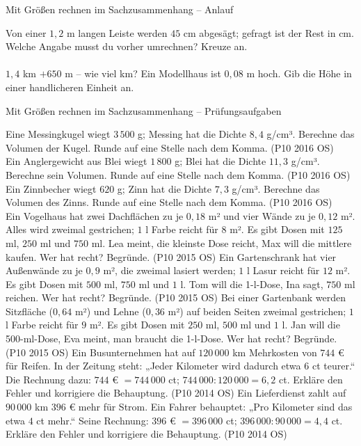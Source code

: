 \begin{aufgabe}{Mit Größen rechnen im Sachzusammenhang – Anlauf}
\begin{teile}
\teil Von einer $1{,}2$ m langen Leiste werden $45$ cm abgesägt; gefragt ist der Rest in cm. Welche Angabe musst du vorher umrechnen? Kreuze an.\\ \\ 
\teil $1{,}4$ km $+ 650$ m – wie viel km? \leerfeld[km]
\teil Ein Modellhaus ist $0{,}08$ m hoch. Gib die Höhe in einer handlicheren Einheit an. \leerfeld \leerfeld
\end{teile}
\end{aufgabe}

\begin{aufgabe}{Mit Größen rechnen im Sachzusammenhang – Prüfungsaufgaben}
\begin{teile}
\teil Eine Messingkugel wiegt $3\,500$ g; Messing hat die Dichte $8{,}4$ g/cm³. Berechne das Volumen der Kugel. Runde auf eine Stelle nach dem Komma. \hfill (P10 2016 OS) \\ \leerfeld[cm³]
\teil Ein Anglergewicht aus Blei wiegt $1\,800$ g; Blei hat die Dichte $11{,}3$ g/cm³. Berechne sein Volumen. Runde auf eine Stelle nach dem Komma. \hfill (P10 2016 OS) \\ \leerfeld[cm³]
\teil Ein Zinnbecher wiegt $620$ g; Zinn hat die Dichte $7{,}3$ g/cm³. Berechne das Volumen des Zinns. Runde auf eine Stelle nach dem Komma. \hfill (P10 2016 OS) \\ \leerfeld[cm³]
\teil Ein Vogelhaus hat zwei Dachflächen zu je $0{,}18$ m² und vier Wände zu je $0{,}12$ m². Alles wird zweimal gestrichen; $1$ l Farbe reicht für $8$ m². Es gibt Dosen mit $125$ ml, $250$ ml und $750$ ml. Lea meint, die kleinste Dose reicht, Max will die mittlere kaufen. Wer hat recht? Begründe. \hfill (P10 2015 OS)
\teil Ein Gartenschrank hat vier Außenwände zu je $0{,}9$ m², die zweimal lasiert werden; $1$ l Lasur reicht für $12$ m². Es gibt Dosen mit $500$ ml, $750$ ml und $1$ l. Tom will die 1-l-Dose, Ina sagt, $750$ ml reichen. Wer hat recht? Begründe. \hfill (P10 2015 OS)
\teil Bei einer Gartenbank werden Sitzfläche ($0{,}64$ m²) und Lehne ($0{,}36$ m²) auf beiden Seiten zweimal gestrichen; $1$ l Farbe reicht für $9$ m². Es gibt Dosen mit $250$ ml, $500$ ml und $1$ l. Jan will die 500-ml-Dose, Eva meint, man braucht die 1-l-Dose. Wer hat recht? Begründe. \hfill (P10 2015 OS)
\teil Ein Busunternehmen hat auf $120\,000$ km Mehrkosten von $744$ € für Reifen. In der Zeitung steht: „Jeder Kilometer wird dadurch etwa $6$ ct teurer.“ Die Rechnung dazu: $744$ € $= 744\,000$ ct; $744\,000 : 120\,000 = 6{,}2$ ct. Erkläre den Fehler und korrigiere die Behauptung. \hfill (P10 2014 OS)
\teil Ein Lieferdienst zahlt auf $90\,000$ km $396$ € mehr für Strom. Ein Fahrer behauptet: „Pro Kilometer sind das etwa $4$ ct mehr.“ Seine Rechnung: $396$ € $= 396\,000$ ct; $396\,000 : 90\,000 = 4{,}4$ ct. Erkläre den Fehler und korrigiere die Behauptung. \hfill (P10 2014 OS)
\end{teile}
\end{aufgabe}
